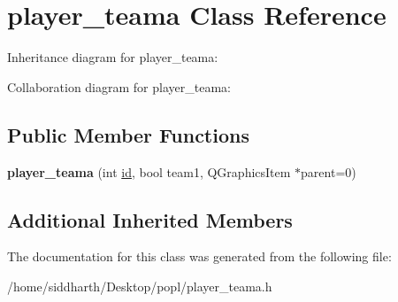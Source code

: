 \hypertarget{classplayer__teama}{}\section{player\+\_\+teama Class Reference}
\label{classplayer__teama}


Inheritance diagram for player\+\_\+teama\+:


Collaboration diagram for player\+\_\+teama\+:
\subsection*{Public Member Functions}
\begin{DoxyCompactItemize}
\item 
{\bfseries player\+\_\+teama} (int \hyperlink{classplayer_ae9ae277c4f56fd68e1251c4eb54ef5c5}{id}, bool team1, Q\+Graphics\+Item $\ast$parent=0)\hypertarget{classplayer__teama_a9b4a2947095e0788415e2d9c5611bae8}{}\label{classplayer__teama_a9b4a2947095e0788415e2d9c5611bae8}

\end{DoxyCompactItemize}
\subsection*{Additional Inherited Members}


The documentation for this class was generated from the following file\+:\begin{DoxyCompactItemize}
\item 
/home/siddharth/\+Desktop/popl/player\+\_\+teama.\+h\end{DoxyCompactItemize}
